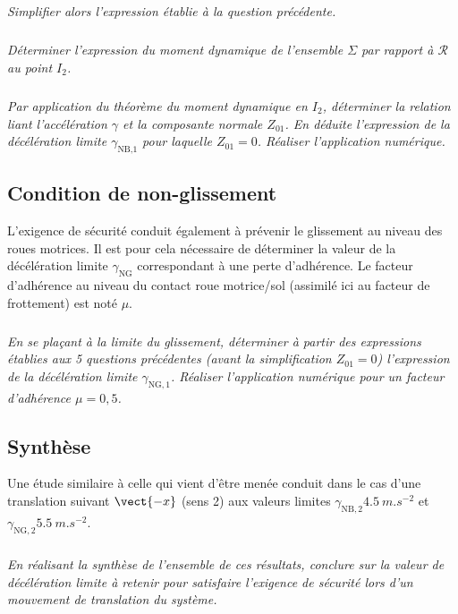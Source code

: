 \begin{multicols}{2}
\subparagraph{}\textit{Simplifier alors l'expression établie à la question précédente.}
\subparagraph{}\textit{Déterminer l'expression du moment dynamique de l'ensemble $\Sigma$ par rapport à $\mathcal{R}$ au point $I_2$.}
\subparagraph{}\textit{Par application du théorème du moment dynamique en $I_2$, déterminer la relation liant l'accélération $\gamma$ et la composante normale $Z_{01}$. En déduite l'expression de la décélération limite $\gamma_{\text{NB,1}}$ pour laquelle $Z_{01}=0$. Réaliser l'application numérique.}


\subsection*{Condition de non-glissement}

L'exigence de sécurité conduit également à prévenir le glissement au niveau des roues motrices. Il est pour cela nécessaire de déterminer la valeur de la décélération limite $\gamma_{\text{NG}}$ correspondant à une perte d'adhérence. Le facteur d'adhérence au niveau du contact roue motrice/sol (assimilé ici au facteur de frottement) est noté $\mu$.

\subparagraph{}\textit{En se plaçant à la limite du glissement, déterminer à partir des expressions établies aux 5 questions précédentes (avant la simplification $Z_{01}=0$) l'expression de la décélération limite $\gamma_{\text{NG},1}$. Réaliser l'application numérique pour un facteur d'adhérence $\mu=0,5$.}

\subsection*{Synthèse}
Une étude similaire à celle qui vient d'être menée conduit dans le cas d'une translation suivant $\vect{-x}$ (sens 2) aux valeurs limites $\gamma_{\text{NB},2}\SI{4,5}{m.s^{-2}}$ et $\gamma_{\text{NG},2}\SI{5,5}{m.s^{-2}}$.

\subparagraph{}\textit{En réalisant la synthèse de l'ensemble de ces résultats, conclure sur la valeur de décélération limite à retenir pour satisfaire l'exigence de sécurité lors d'un mouvement de translation du système.}

\ifprof
\else
\end{multicols}
\fi

%